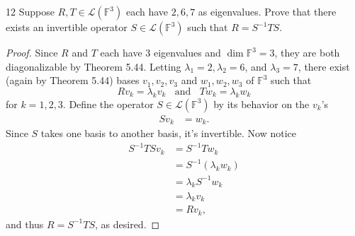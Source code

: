 \documentclass{extarticle}
\newenvironment{problem}[1]{\begin{prob*}{#1}{}}{\end{prob*}}
\newcommand{\F}{\mathbb{F}}
\newcommand{\Hom}{\mathcal{L}}
\begin{document}
\begin{problem}{12}
Suppose $R,T\in\Hom(\F^3)$ each have $2, 6, 7$ as eigenvalues.  Prove that there exists an invertible operator $S\in\Hom(\F^3)$ such that $R = S^{-1}TS$.
\end{problem}
\begin{proof}
Since $R$ and $T$ each have $3$ eigenvalues and $\dim \F^3 = 3$, they are both diagonalizable by Theorem 5.44.  Letting $\lambda_1 = 2, \lambda_2 = 6$, and $\lambda_3 = 7$, there exist (again by Theorem 5.44) bases $v_1, v_2, v_3$ and $w_1, w_2, w_3$ of $\F^3$ such that 
\begin{equation*}
Rv_k = \lambda_k v_k ~~~~\text{and}~~~~ Tw_k = \lambda_k w_k
\end{equation*}
for $k = 1,2, 3$.  Define the operator $S\in\Hom(\F^3)$ by its behavior on the $v_k$'s
\begin{align*}
Sv_k &= w_k.
\end{align*}
Since $S$ takes one basis to another basis, it's invertible.  Now notice
\begin{align*}
S^{-1}TSv_k &= S^{-1}Tw_k\\
&= S^{-1}(\lambda_kw_k)\\
&= \lambda_kS^{-1}w_k\\
&= \lambda_kv_k\\
&= Rv_k,
\end{align*}
and thus $R = S^{-1}TS$, as desired.
\end{proof}
\end{document}
